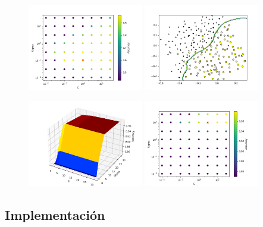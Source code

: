 \documentclass[11pt]{article}
\begin{document}
 \begin{figure}[h!]
    \begin{center}
    \includegraphics[width=0.45\textwidth]{Figura5.png}
    \includegraphics[width=0.45\textwidth]{Figura6.png}
    \end{center}
 \end{figure}

 \begin{figure}[h!]
    \begin{center}
    \includegraphics[width=0.45\textwidth]{Figura7.png}
    \includegraphics[width=0.45\textwidth]{Figura8.png}
    \end{center}
 \end{figure}



\newpage
\subsection{Implementación}


\end{document}
